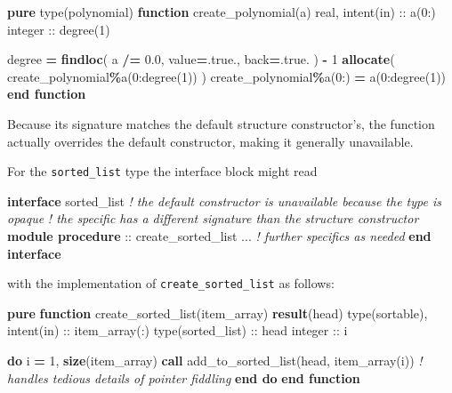 \documentclass[
  paper=a4,
  ,captions=tableheading
]{scrartcl}
\newenvironment{Shaded}{\begin{snugshade}}{\end{snugshade}}
\newcommand{\CommentTok}[1]{\textcolor[rgb]{0.56,0.35,0.01}{\textit{#1}}}
\newcommand{\ConstantTok}[1]{\textcolor[rgb]{0.56,0.35,0.01}{#1}}
\newcommand{\DataTypeTok}[1]{\textcolor[rgb]{0.13,0.29,0.53}{#1}}
\newcommand{\DecValTok}[1]{\textcolor[rgb]{0.00,0.00,0.81}{#1}}
\newcommand{\FloatTok}[1]{\textcolor[rgb]{0.00,0.00,0.81}{#1}}
\newcommand{\FunctionTok}[1]{\textcolor[rgb]{0.13,0.29,0.53}{\textbf{#1}}}
\newcommand{\KeywordTok}[1]{\textcolor[rgb]{0.13,0.29,0.53}{\textbf{#1}}}
\newcommand{\NormalTok}[1]{#1}
\newcommand{\OperatorTok}[1]{\textcolor[rgb]{0.81,0.36,0.00}{\textbf{#1}}}
\begin{document}
\begin{Shaded}
\begin{Highlighting}[]
\KeywordTok{pure} \DataTypeTok{type(polynomial)} \KeywordTok{function}\NormalTok{ create\_polynomial(a)}
  \DataTypeTok{real}\NormalTok{, }\DataTypeTok{intent(in)} \DataTypeTok{::}\NormalTok{ a(}\DecValTok{0}\NormalTok{:)}
  \DataTypeTok{integer} \DataTypeTok{::}\NormalTok{ degree(}\DecValTok{1}\NormalTok{)}

\NormalTok{  degree }\KeywordTok{=} \FunctionTok{findloc}\NormalTok{( a }\OperatorTok{/=} \FloatTok{0.0}\NormalTok{, }\DataTypeTok{value}\KeywordTok{=}\ConstantTok{.true.}\NormalTok{, back}\KeywordTok{=}\ConstantTok{.true.}\NormalTok{ ) }\KeywordTok{{-}} \DecValTok{1}
  \KeywordTok{allocate}\NormalTok{( create\_polynomial}\OperatorTok{\%}\NormalTok{a(}\DecValTok{0}\NormalTok{:degree(}\DecValTok{1}\NormalTok{)) )}
\NormalTok{  create\_polynomial}\OperatorTok{\%}\NormalTok{a(}\DecValTok{0}\NormalTok{:) }\KeywordTok{=}\NormalTok{ a(}\DecValTok{0}\NormalTok{:degree(}\DecValTok{1}\NormalTok{))}
\KeywordTok{end function}
\end{Highlighting}
\end{Shaded}

Because its signature matches the default structure constructor's, the
function actually overrides the default constructor, making it generally
unavailable.

For the \texttt{sorted\_list} type the interface block might read

\begin{Shaded}
\begin{Highlighting}[]
\KeywordTok{interface}\NormalTok{ sorted\_list}
\CommentTok{! the default constructor is unavailable because the type is opaque}
\CommentTok{! the specific has a different signature than the structure constructor}
  \KeywordTok{module procedure} \DataTypeTok{::}\NormalTok{ create\_sorted\_list}
\NormalTok{  ... }\CommentTok{! further specifics as needed}
\KeywordTok{end interface}
\end{Highlighting}
\end{Shaded}

with the implementation of \texttt{create\_sorted\_list} as follows:

\begin{Shaded}
\begin{Highlighting}[]
\KeywordTok{pure} \KeywordTok{function}\NormalTok{ create\_sorted\_list(item\_array) }\KeywordTok{result}\NormalTok{(head)}
  \DataTypeTok{type(sortable)}\NormalTok{, }\DataTypeTok{intent(in)} \DataTypeTok{::}\NormalTok{ item\_array(:)}
  \DataTypeTok{type(sorted\_list)} \DataTypeTok{::}\NormalTok{ head}
  \DataTypeTok{integer} \DataTypeTok{::}\NormalTok{ i}

  \KeywordTok{do}\NormalTok{ i }\KeywordTok{=} \DecValTok{1}\NormalTok{, }\FunctionTok{size}\NormalTok{(item\_array)}
    \KeywordTok{call}\NormalTok{ add\_to\_sorted\_list(head, item\_array(i))}
    \CommentTok{! handles tedious details of pointer fiddling}
  \KeywordTok{end do}
\KeywordTok{end function}
\end{Highlighting}
\end{Shaded}
\end{document}
